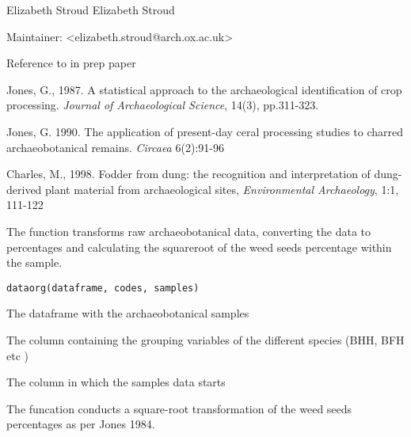 \documentclass[a4paper]{book}
\begin{document}
%
\begin{Author}\relax
Elizabeth Stroud
Elizabeth Stroud

Maintainer: <elizabeth.stroud@arch.ox.ac.uk>
\end{Author}
%
\begin{References}\relax
Reference to in prep paper

Jones, G., 1987. A statistical approach to the archaeological identification of crop processing. \emph{Journal of Archaeological Science}, 14(3), pp.311-323.

Jones, G. 1990. The application of present-day ceral processing studies to charred archaeobotanical remains. \emph{Circaea} 6(2):91-96

Charles, M., 1998. Fodder from dung: the recognition and interpretation of dung-derived plant material from archaeological sites, \emph{Environmental Archaeology}, 1:1, 111-122

\end{References}
%
\begin{Description}\relax
The function transforms raw archaeobotanical data, converting the data to percentages and calculating the squareroot of the weed seeds percentage within the sample.

\end{Description}
%
\begin{Usage}
\begin{verbatim}
dataorg(dataframe, codes, samples)
\end{verbatim}
\end{Usage}
%
\begin{Arguments}
\begin{ldescription}
\item[\code{dataframe}] The dataframe with the archaeobotanical samples
\item[\code{codes}] The column containing the grouping variables of the different species (BHH, BFH etc )
\item[\code{samples}] The column in which the samples data starts
\end{ldescription}
\end{Arguments}
%
\begin{Details}\relax
The funcation conducts a square-root transformation of the weed seeds percentages as per Jones 1984.
\end{Details}
\end{document}
